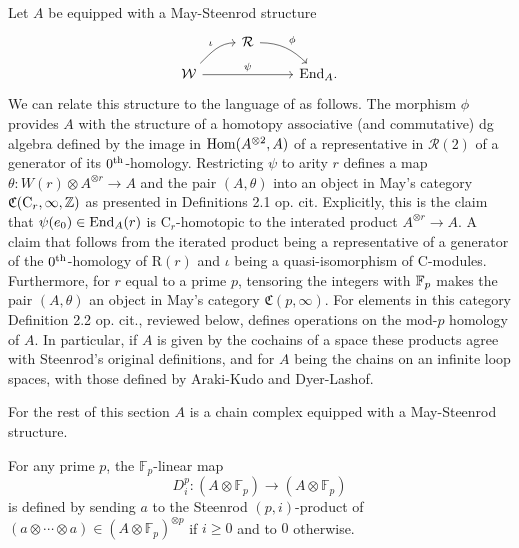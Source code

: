 Let $A$ be equipped with a May-Steenrod structure
\begin{equation*}
\begin{tikzcd}[column sep = normal, row sep = small]
& \mathcal R \arrow[dr, "\phi", out=0] & \\
\mathcal W \arrow[ur, "\iota", in=180] \arrow[rr, "\psi"] & & \End_A.
\end{tikzcd}
\end{equation*}
We can relate this structure to the language of \cite{may70generalapproach} as follows.
The morphism $\phi$ provides $A$ with the structure of a homotopy associative (and commutative) dg algebra defined by the image in $\mathrm{Hom}(A^{\otimes 2}, A)$ of a representative in $\mathcal R(2)$ of a generator of its $0^{\mathrm{th}}$-homology.
Restricting $\psi$ to arity $r$ defines a map $\theta \colon W(r) \otimes A^{\otimes r} \to A$ and the pair $(A, \theta)$ into an object in May's category $\mathfrak{C}(\mathrm C_r, \infty, \mathbb{Z})$ as presented in Definitions 2.1 op. cit.
Explicitly, this is the claim that $\psi(e_0) \in \mathrm{End}_A(r)$ is $\mathrm C_r$-homotopic to the interated product $A^{\otimes r} \to A$.
A claim that follows from the iterated product being a representative of a generator of the $0^{\mathrm{th}}$-homology of $\mathrm R(r)$ and $\iota$ being a quasi-isomorphism of $\mathrm C$-modules.
Furthermore, for $r$ equal to a prime $p$, tensoring the integers with $\mathbb{F}_p$ makes the pair $(A, \theta)$ an object in May's category $\mathfrak{C}(p, \infty)$.
For elements in this category Definition 2.2 op. cit., reviewed below, defines operations on the mod-$p$ homology of $A$.
In particular, if $A$ is given by the cochains of a space these products agree with Steenrod's original definitions, and for $A$ being the chains on an infinite loop spaces, with those defined by Araki-Kudo and Dyer-Lashof.

For the rest of this section $A$ is a chain complex equipped with a May-Steenrod structure.

\begin{definition}
	For any prime $p$, the $\mathbb{F}_p$-linear map
	\begin{equation*}
	D^p_i : (A \otimes \mathbb{F}_p) \to (A \otimes \mathbb{F}_p)
	\end{equation*}
	is defined by sending $a$ to the Steenrod \mbox{$(p, i)$-product} of $(a \otimes \cdots \otimes a) \in (A \otimes \mathbb{F}_p)^{\otimes p}$ if $i \geq 0$ and to $0$ otherwise.
\end{definition}


